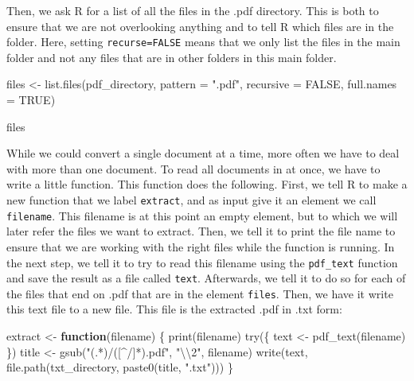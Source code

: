 \documentclass[
]{book}
\newenvironment{Shaded}{\begin{snugshade}}{\end{snugshade}}
\newcommand{\AttributeTok}[1]{\textcolor[rgb]{0.77,0.63,0.00}{#1}}
\newcommand{\ConstantTok}[1]{\textcolor[rgb]{0.00,0.00,0.00}{#1}}
\newcommand{\ControlFlowTok}[1]{\textcolor[rgb]{0.13,0.29,0.53}{\textbf{#1}}}
\newcommand{\FunctionTok}[1]{\textcolor[rgb]{0.00,0.00,0.00}{#1}}
\newcommand{\NormalTok}[1]{#1}
\newcommand{\OtherTok}[1]{\textcolor[rgb]{0.56,0.35,0.01}{#1}}
\newcommand{\SpecialCharTok}[1]{\textcolor[rgb]{0.00,0.00,0.00}{#1}}
\newcommand{\StringTok}[1]{\textcolor[rgb]{0.31,0.60,0.02}{#1}}
\begin{document}
Then, we ask R for a list of all the files in the .pdf directory. This is both to ensure that we are not overlooking anything and to tell R which files are in the folder. Here, setting \texttt{recurse=FALSE} means that we only list the files in the main folder and not any files that are in other folders in this main folder.

\begin{Shaded}
\begin{Highlighting}[]
\NormalTok{files }\OtherTok{\textless{}{-}} \FunctionTok{list.files}\NormalTok{(pdf\_directory, }\AttributeTok{pattern =} \StringTok{".pdf"}\NormalTok{, }\AttributeTok{recursive =} \ConstantTok{FALSE}\NormalTok{, }
    \AttributeTok{full.names =} \ConstantTok{TRUE}\NormalTok{)}

\NormalTok{files}
\end{Highlighting}
\end{Shaded}

While we could convert a single document at a time, more often we have to deal with more than one document. To read all documents in at once, we have to write a little function. This function does the following. First, we tell R to make a new function that we label \texttt{extract}, and as input give it an element we call \texttt{filename}. This filename is at this point an empty element, but to which we will later refer the files we want to extract. Then, we tell it to print the file name to ensure that we are working with the right files while the function is running. In the next step, we tell it to try to read this filename using the \texttt{pdf\_text} function and save the result as a file called \texttt{text}. Afterwards, we tell it to do so for each of the files that end on .pdf that are in the element \texttt{files}. Then, we have it write this text file to a new file. This file is the extracted .pdf in .txt form:

\begin{Shaded}
\begin{Highlighting}[]
\NormalTok{extract }\OtherTok{\textless{}{-}} \ControlFlowTok{function}\NormalTok{(filename) \{}
    \FunctionTok{print}\NormalTok{(filename)}
    \FunctionTok{try}\NormalTok{(\{}
\NormalTok{        text }\OtherTok{\textless{}{-}} \FunctionTok{pdf\_text}\NormalTok{(filename)}
\NormalTok{    \})}
\NormalTok{    title }\OtherTok{\textless{}{-}} \FunctionTok{gsub}\NormalTok{(}\StringTok{"(.*)/([\^{}/]*).pdf"}\NormalTok{, }\StringTok{"}\SpecialCharTok{\textbackslash{}\textbackslash{}}\StringTok{2"}\NormalTok{, filename)}
    \FunctionTok{write}\NormalTok{(text, }\FunctionTok{file.path}\NormalTok{(txt\_directory, }\FunctionTok{paste0}\NormalTok{(title, }\StringTok{".txt"}\NormalTok{)))}
\NormalTok{\}}
\end{Highlighting}
\end{Shaded}
\end{document}
